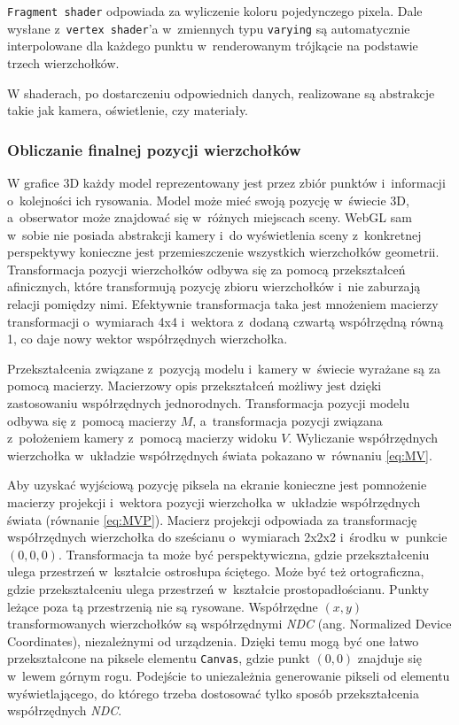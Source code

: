 \texttt{Fragment shader} odpowiada za wyliczenie koloru pojedynczego pixela. Dale wysłane z~\texttt{vertex shader}'a w~zmiennych typu \texttt{varying} są automatycznie interpolowane dla każdego punktu w~renderowanym trójkącie na podstawie trzech wierzchołków.

W shaderach, po dostarczeniu odpowiednich danych, realizowane są abstrakcje takie jak kamera, oświetlenie, czy materiały.

\subsubsection{Obliczanie finalnej pozycji wierzchołków}

W grafice 3D każdy model reprezentowany jest przez zbiór punktów i~informacji o~kolejności ich rysowania. Model może mieć swoją pozycję w~świecie 3D, a~obserwator może znajdować się w~różnych miejscach sceny. WebGL sam w~sobie nie posiada abstrakcji kamery i~do wyświetlenia sceny z~konkretnej perspektywy konieczne jest przemieszczenie wszystkich wierzchołków geometrii. Transformacja pozycji wierzchołków odbywa się za pomocą przekształceń afinicznych, które transformują pozycję zbioru wierzchołków i~nie zaburzają relacji pomiędzy nimi. Efektywnie transformacja taka jest mnożeniem macierzy transformacji o~wymiarach 4x4 i~wektora z~dodaną czwartą współrzędną równą 1, co daje nowy wektor współrzędnych wierzchołka.

Przekształcenia związane z~pozycją modelu i~kamery w~świecie wyrażane są za pomocą macierzy. Macierzowy opis przekształceń możliwy jest dzięki zastosowaniu współrzędnych jednorodnych\cite{Homogeneous}. Transformacja pozycji modelu odbywa się z~pomocą macierzy $M$, a~transformacja pozycji związana z~położeniem kamery z~pomocą macierzy widoku $V$. Wyliczanie współrzędnych wierzchołka w~układzie współrzędnych świata pokazano w~równaniu \ref{eq:MV}.

Aby uzyskać wyjściową pozycję piksela na ekranie konieczne jest pomnożenie macierzy projekcji i~wektora pozycji wierzchołka w~układzie współrzędnych świata (równanie \ref{eq:MVP}). Macierz projekcji odpowiada za transformację współrzędnych wierzchołka do sześcianu o~wymiarach 2x2x2 i~środku w~punkcie $(0, 0, 0)$. Transformacja ta może być perspektywiczna, gdzie przekształceniu ulega przestrzeń w~kształcie ostrosłupa ściętego. Może być też ortograficzna, gdzie przekształceniu ulega przestrzeń w~kształcie prostopadłościanu. Punkty leżące poza tą przestrzenią nie są rysowane. Współrzędne $(x, y)$ transformowanych wierzchołków są współrzędnymi \textit{NDC} (ang. Normalized Device Coordinates), niezależnymi od urządzenia. Dzięki temu mogą być one łatwo przekształcone na piksele elementu \texttt{Canvas}, gdzie punkt $(0, 0)$ znajduje się w~lewem górnym rogu. Podejście to uniezależnia generowanie pikseli od elementu wyświetlającego, do którego trzeba dostosować tylko sposób przekształcenia współrzędnych \textit{NDC}.

